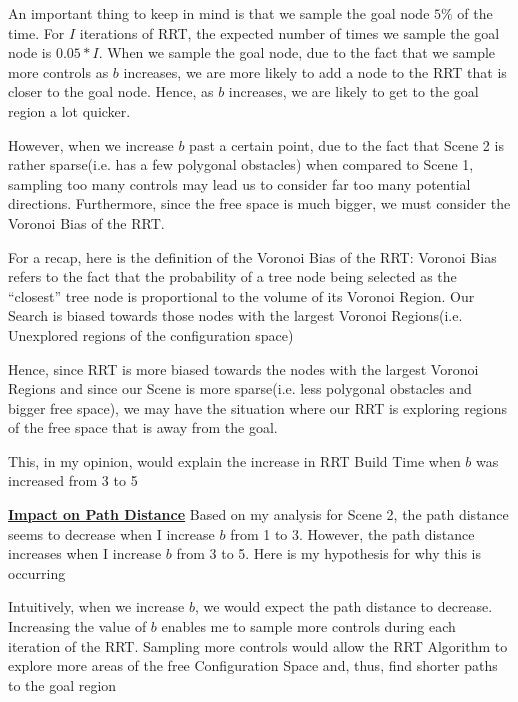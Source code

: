 \documentclass{article}
\begin{document}
An important thing to keep in mind is that we sample the goal node $5\%$ of the time. For $I$ iterations of RRT, the expected number of times we sample the goal node is $0.05 * I$. When we sample the goal node, due to the fact that we sample more controls as $b$ increases, we are more likely to add a node to the RRT that is closer to the goal node. Hence, as $b$ increases, we are likely to get to the goal region a lot quicker. \newline 

However, when we increase $b$ past a certain point, due to the fact that Scene 2 is rather sparse(i.e. has a few polygonal obstacles) when compared to Scene 1, sampling too many controls may lead us to consider far too many potential directions. Furthermore, since the free space is much bigger, we must consider the Voronoi Bias of the RRT. \newline 

For a recap, here is the definition of the Voronoi Bias of the RRT: Voronoi Bias refers to the fact that the probability of a tree node being selected as the “closest” tree node is proportional to the volume of its Voronoi Region. Our Search is biased towards those nodes with the largest Voronoi Regions(i.e. Unexplored regions of the configuration space)  \newline 

Hence, since RRT is more biased towards the nodes with the largest Voronoi Regions and since our Scene is more sparse(i.e. less polygonal obstacles and bigger free space), we may have the situation where our RRT is exploring regions of the free space that is away from the goal. \newline 

This, in my opinion, would explain the increase in RRT Build Time when $b$ was increased from 3 to 5 \newline 

\textbf{\underline{Impact on Path Distance}} \newline
Based on my analysis for Scene 2, the path distance seems to decrease when I increase $b$ from 1 to 3. However, the path distance increases when I increase $b$ from 3 to 5. Here is my hypothesis for why this is occurring \newline 

Intuitively, when we increase $b$, we would expect the path distance to decrease. Increasing the value of $b$ enables me to sample more controls during each iteration of the RRT. Sampling more controls would allow the RRT Algorithm to explore more areas of the free Configuration Space and, thus, find shorter paths to the goal region \newline 
\end{document}
